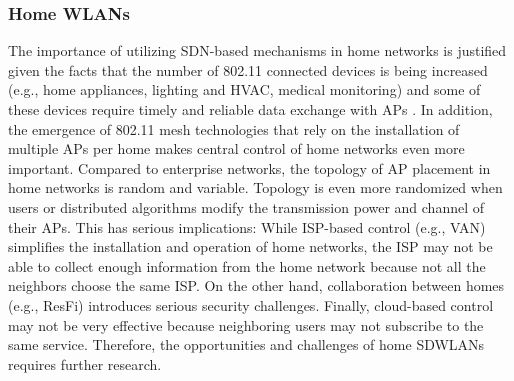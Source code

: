 





\subsubsection{\textbf{Home WLANs}}
\label{arch_discus_home_net}
The importance of utilizing SDN-based mechanisms in home networks is justified given the facts that the number of 802.11 connected devices is being increased (e.g., home appliances, lighting and HVAC, medical monitoring) and some of these devices require timely and reliable data exchange with APs \cite{Qin2014,Tozlu2012,REWIMO}.
In addition, the emergence of 802.11 mesh technologies that rely on the installation of multiple APs per home \cite{jing2016multi} makes central control of home networks even more important.
Compared to enterprise networks, the topology of AP placement in home networks is random and variable.
Topology is even more randomized when users or distributed algorithms modify the transmission power and channel of their APs.
This has serious implications:
While ISP-based control (e.g., VAN) simplifies the installation and operation of home networks, the ISP may not be able to collect enough information from the home network because not all the neighbors choose the same ISP.
On the other hand, collaboration between homes (e.g., ResFi) introduces serious security challenges.
Finally, cloud-based control may not be very effective because neighboring users may not subscribe to the same service.
Therefore, the opportunities and challenges of home SDWLANs requires further research.


